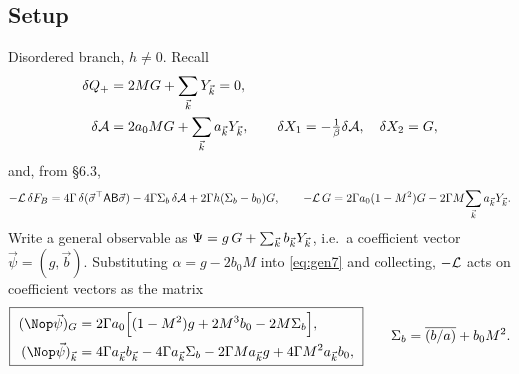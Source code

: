 \subsection{Setup}
Disordered branch, $h\neq0$. Recall
\begin{align}
  \delta Q_+&=2MG+\sum_{\vec k}Y_{\vec k}=0 ,
  \label{eq:Q7}\\
  \delta\mathcal{A}&=2a_0MG+\sum_{\vec k}a_{\vec k}Y_{\vec k},\qquad \delta X_1=-\tfrac1\beta\delta\mathcal{A},\quad\delta X_2=G,
  \label{eq:dA7}
\end{align}
and, from \S6.3,
\begin{equation}
  -\mathcal{L}\,\delta F_B=4\Gamma\,\delta(\vec\sigma^\top\mathsf A\mathsf B\vec\sigma)-4\Gamma\Sigma_b\,\delta\mathcal{A}
   +2\Gamma h(\Sigma_b-b_0)G,
  \qquad
  -\mathcal{L}\,G=2\Gamma a_0(1-M^{2})G-2\Gamma M\!\sum_{\vec k}a_{\vec k}Y_{\vec k}.
  \label{eq:gen7}
\end{equation}
Write a general observable as $\Psi=g\,G+\sum_{\vec k}b_{\vec k}Y_{\vec k}$, i.e.\ a coefficient
vector $\vec\psi=(g,\vec b)$. Substituting $\alpha=g-2b_0M$ into \eqref{eq:gen7} and
collecting, $-\mathcal{L}$ acts on coefficient vectors as the matrix
\begin{equation}
  \boxed{\
  \begin{aligned}
  (\Nop\vec\psi)_G&=2\Gamma a_0\Big[(1-M^{2})g+2M^{3}b_0-2M\Sigma_b\Big],\\
  (\Nop\vec\psi)_{\bk}&=4\Gamma a_{\bk}b_{\bk}-4\Gamma a_{\bk}\Sigma_b
   -2\Gamma M a_{\bk}g+4\Gamma M^{2}a_{\bk}b_0 ,
  \end{aligned}\ }
  \qquad \Sigma_b=\overline{(b/a)}+b_0M^{2} .
  \label{eq:Nop}
\end{equation}

